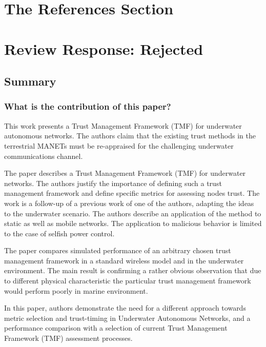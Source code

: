 \documentclass[runningheads,a4paper]{llncs}
\begin{document}
\section{The References Section}\label{references}




\pagebreak

\section{Review Response: Rejected}

\subsection{Summary}


\subsubsection{What is the contribution of this paper?}

This work presents a Trust Management Framework (TMF) for underwater autonomous networks. The authors claim that the existing trust methods in the terrestrial MANETs must be re-appraised for the challenging underwater communications channel. 

The paper describes a Trust Management Framework (TMF) for underwater networks. The authors justify the importance of defining such a trust management framework and define specific metrics for assessing nodes trust. The work is a follow-up of a previous work of one of the authors, adapting the ideas to the underwater scenario. The authors describe an application of the method to static as well as mobile networks. The application to malicious behavior is limited to the case of selfish power control.

The paper compares simulated performance of an arbitrary chosen trust management framework in a standard wireless model and in the underwater environment.
The main result is confirming a rather obvious observation that due to different physical characteristic the particular trust management framework would perform poorly in marine environment.

In this paper, authors demonstrate the need for a different approach towards metric selection and trust-timing in Underwater Autonomous Networks, and a performance comparison with a selection of current Trust Management Framework (TMF) assessment processes.
\end{document}
